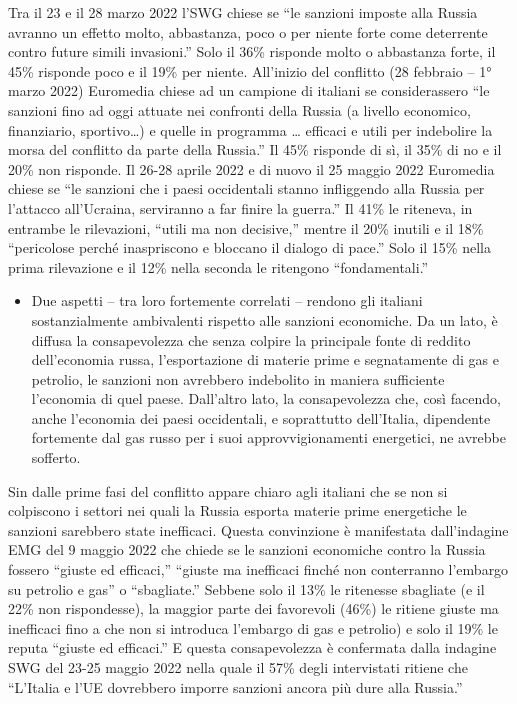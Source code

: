 \documentclass[
  openany]{book}
\providecommand{\tightlist}{%
  \setlength{\itemsep}{0pt}\setlength{\parskip}{0pt}}
\begin{document}
Tra il 23 e il 28 marzo 2022 l'SWG chiese se ``le sanzioni imposte alla Russia avranno un effetto molto, abbastanza, poco o per niente forte come deterrente contro future simili invasioni.'' Solo il 36\% risponde molto o abbastanza forte, il 45\% risponde poco e il 19\% per niente. All'inizio del conflitto (28 febbraio -- 1° marzo 2022) Euromedia chiese ad un campione di italiani se considerassero ``le sanzioni fino ad oggi attuate nei confronti della Russia (a livello economico, finanziario, sportivo\ldots) e quelle in programma \ldots{} efficaci e utili per indebolire la morsa del conflitto da parte della Russia.'' Il 45\% risponde di sì, il 35\% di no e il 20\% non risponde. Il 26-28 aprile 2022 e di nuovo il 25 maggio 2022 Euromedia chiese se ``le sanzioni che i paesi occidentali stanno infliggendo alla Russia per l'attacco all'Ucraina, serviranno a far finire la guerra.'' Il 41\% le riteneva, in entrambe le rilevazioni, ``utili ma non decisive,'' mentre il 20\% inutili e il 18\% ``pericolose perché inaspriscono e bloccano il dialogo di pace.'' Solo il 15\% nella prima rilevazione e il 12\% nella seconda le ritengono ``fondamentali.''

\begin{itemize}
\tightlist
\item
  Due aspetti -- tra loro fortemente correlati -- rendono gli italiani sostanzialmente ambivalenti rispetto alle sanzioni economiche. Da un lato, è diffusa la consapevolezza che senza colpire la principale fonte di reddito dell'economia russa, l'esportazione di materie prime e segnatamente di gas e petrolio, le sanzioni non avrebbero indebolito in maniera sufficiente l'economia di quel paese. Dall'altro lato, la consapevolezza che, così facendo, anche l'economia dei paesi occidentali, e soprattutto dell'Italia, dipendente fortemente dal gas russo per i suoi approvvigionamenti energetici, ne avrebbe sofferto.
\end{itemize}

Sin dalle prime fasi del conflitto appare chiaro agli italiani che se non si colpiscono i settori nei quali la Russia esporta materie prime energetiche le sanzioni sarebbero state inefficaci. Questa convinzione è manifestata dall'indagine EMG del 9 maggio 2022 che chiede se le sanzioni economiche contro la Russia fossero ``giuste ed efficaci,'' ``giuste ma inefficaci finché non conterranno l'embargo su petrolio e gas'' o ``sbagliate.'' Sebbene solo il 13\% le ritenesse sbagliate (e il 22\% non rispondesse), la maggior parte dei favorevoli (46\%) le ritiene giuste ma inefficaci fino a che non si introduca l'embargo di gas e petrolio) e solo il 19\% le reputa ``giuste ed efficaci.'' E questa consapevolezza è confermata dalla indagine SWG del 23-25 maggio 2022 nella quale il 57\% degli intervistati ritiene che ``L'Italia e l'UE dovrebbero imporre sanzioni ancora più dure alla Russia.''
\end{document}
